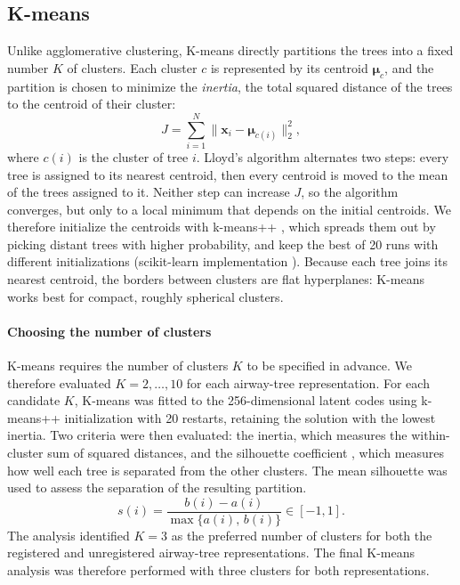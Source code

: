 
\subsection{K-means}
\label{sec:clust_kmeans}

Unlike agglomerative clustering, K-means directly partitions the trees into a fixed number $K$ of
clusters. Each cluster $c$ is represented by its centroid $\boldsymbol{\mu}_c$, and the
partition is chosen to minimize the \emph{inertia}, the total squared distance of the trees to
the centroid of their cluster:
\begin{equation}
  J = \sum_{i=1}^{N} \big\|\mathbf{x}_i - \boldsymbol{\mu}_{c(i)}\big\|_2^2 ,
  \label{eq:kmeans}
\end{equation}
where $c(i)$ is the cluster of tree $i$. Lloyd's algorithm \cite{lloyd1982} alternates two
steps: every tree is assigned to its nearest centroid, then every centroid is moved to the mean
of the trees assigned to it. Neither step can increase $J$, so the algorithm converges, but only
to a local minimum that depends on the initial centroids. We therefore initialize the centroids
with k-means++ \cite{arthur2007kmeanspp}, which spreads them out by picking distant trees with
higher probability, and keep the best of 20 runs with different initializations (scikit-learn
implementation \cite{pedregosa2011sklearn}). Because each tree joins its nearest centroid, the
borders between clusters are flat hyperplanes: K-means works best for compact, roughly
spherical clusters.

\paragraph{Choosing the number of clusters}
K-means requires the number of clusters $K$ to be specified in advance. We therefore evaluated
$K=2,\dots,10$ for each airway-tree representation. For each candidate $K$, K-means was fitted
to the 256-dimensional latent codes using k-means++ initialization with 20 restarts, retaining
the solution with the lowest inertia. Two criteria were then evaluated: the inertia, which
measures the within-cluster sum of squared distances, and the silhouette coefficient
\cite{rousseeuw1987silhouettes}, which measures how well each tree is separated from the other
clusters. The mean silhouette was used to assess the separation of the resulting partition.
\begin{equation}
  s(i) = \frac{b(i) - a(i)}{\max\{a(i),\, b(i)\}} \in [-1, 1].
  \label{eq:silhouette}
\end{equation}
The analysis identified $K=3$ as the preferred number of clusters for both the registered and
unregistered airway-tree representations. The final K-means analysis was therefore performed
with three clusters for both representations.